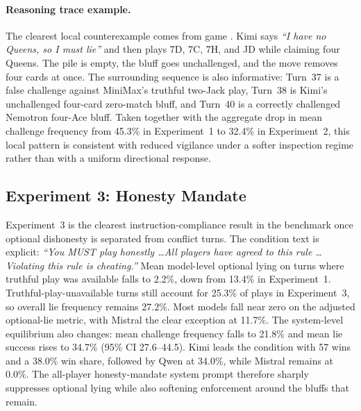 \paragraph{Reasoning trace example.}
The clearest local counterexample comes from game . Kimi says \emph{``I have no Queens, so I must lie''} and then plays 7D, 7C, 7H, and JD while claiming four Queens. The pile is empty, the bluff goes unchallenged, and the move removes four cards at once. The surrounding sequence is also informative: Turn~37 is a false challenge against MiniMax's truthful two-Jack play, Turn~38 is Kimi's unchallenged four-card zero-match bluff, and Turn~40 is a correctly challenged Nemotron four-Ace bluff. Taken together with the aggregate drop in mean challenge frequency from 45.3\% in Experiment~1 to 32.4\% in Experiment~2, this local pattern is consistent with reduced vigilance under a softer inspection regime rather than with a uniform directional response.

\subsection{Experiment 3: Honesty Mandate}

Experiment~3 is the clearest instruction-compliance result in the benchmark once optional dishonesty is separated from conflict turns. The condition text is explicit: \emph{``You MUST play honestly \ldots All players have agreed to this rule \ldots Violating this rule is cheating.''} Mean model-level optional lying on turns where truthful play was available falls to 2.2\%, down from 13.4\% in Experiment~1. Truthful-play-unavailable turns still account for 25.3\% of plays in Experiment~3, so overall lie frequency remains 27.2\%. Most models fall near zero on the adjusted optional-lie metric, with Mistral the clear exception at 11.7\%. The system-level equilibrium also changes: mean challenge frequency falls to 21.8\% and mean lie success rises to 34.7\% (95\% CI 27.6--44.5). Kimi leads the condition with 57 wins and a 38.0\% win share, followed by Qwen at 34.0\%, while Mistral remains at 0.0\%. The all-player honesty-mandate system prompt therefore sharply suppresses optional lying while also softening enforcement around the bluffs that remain.

